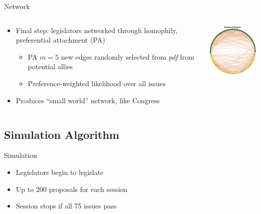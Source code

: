 \documentclass[14pt]{beamer}
\begin{document}
\begin{frame}{Network} %
\begin{columns}[T] %
\begin{column}[T]{9cm} 
\begin{itemize}
\item Final step: legislators networked through homophily, preferential attachment (PA) 
 \begin{itemize}
 \item PA $m=5$ new edges randomly selected from \textit{pdf} from potential allies
 \item Preference-weighted likelihood over all issues
 \end{itemize}
\item Produces ``small world'' network, like Congress 
\end{itemize}
\end{column}
\begin{column}[T]{3.5cm}
 \includegraphics[width=3.45cm]{sbp_network_diagram_2014-05-03_170445_crop.png}
 \label{One example of the 72 networks produced in the simulation baseline data.}
\end{column}
\end{columns}

\end{frame}

\subsection*{Simulation Algorithm} %

\begin{frame}{Simulation}
\begin{itemize}
\item Legislators begin to legislate
\item Up to 200 proposals for each session
\item Session stops if all 75 issues pass   
\end{itemize}
\end{frame}
\end{document}
